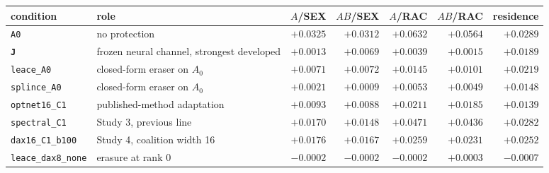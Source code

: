 \begin{tabular}{l l r r r r r}
\toprule
condition & role & $A$/SEX & $AB$/SEX & $A$/RAC & $AB$/RAC & residence \\
\midrule
\texttt{A0} & no protection & $+0.0325$ & $+0.0312$ & $+0.0632$ & $+0.0564$ & $+0.0289$ \\
\bfseries \texttt{J} & frozen neural channel, strongest developed & $+0.0013$ & $+0.0069$ & $+0.0039$ & $+0.0015$ & $+0.0189$ \\
\texttt{leace\_A0} & closed-form eraser on $A_0$ & $+0.0071$ & $+0.0072$ & $+0.0145$ & $+0.0101$ & $+0.0219$ \\
\texttt{splince\_A0} & closed-form eraser on $A_0$ & $+0.0021$ & $+0.0009$ & $+0.0053$ & $+0.0049$ & $+0.0148$ \\
\texttt{optnet16\_C1} & published-method adaptation & $+0.0093$ & $+0.0088$ & $+0.0211$ & $+0.0185$ & $+0.0139$ \\
\texttt{spectral\_C1} & Study 3, previous line & $+0.0170$ & $+0.0148$ & $+0.0471$ & $+0.0436$ & $+0.0282$ \\
\midrule
\texttt{dax16\_C1\_b100} & Study 4, coalition width 16 & $+0.0176$ & $+0.0167$ & $+0.0259$ & $+0.0231$ & $+0.0252$ \\
\texttt{leace\_dax8\_none} & erasure at rank 0 & $-0.0002$ & $-0.0002$ & $-0.0002$ & $+0.0003$ & $-0.0007$ \\
\bottomrule
\end{tabular}
